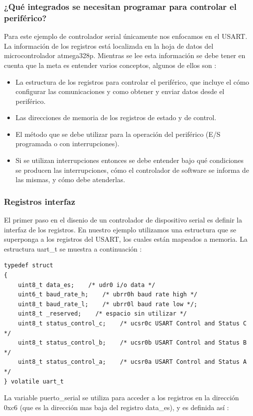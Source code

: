 \documentclass[12pt]{article}
\begin{document}
\subsubsection{¿Qué integrados se necesitan programar para controlar el periférico?}
Para este ejemplo de controlador serial únicamente nos enfocamos
en el USART. La información de los registros está localizada en la hoja
de datos del microcontrolador atmega328p. Mientras se lee esta información
se debe tener en cuenta que la meta es entender varios conceptos, algunos
de ellos son :
\begin{itemize}
\item La estructura de los registros para controlar el periférico, que incluye
el cómo configurar las comunicaciones y como obtener y enviar
datos desde el periférico.
\item Las direcciones de memoria de los registros de estado y de control.
\item El método que se debe utilizar para la operación del periférico (E/S 
programada o con interrupciones).
\item Si se utilizan interrupciones entonces se debe entender bajo qué condiciones
se producen las interrupciones, cómo el controlador de software se informa
de las mismas, y cómo debe atenderlas.
\end{itemize}

\subsubsection *{Registros interfaz}

El primer paso en el disenio de un controlador de dispositivo serial es definir
la interfaz de los registros. En nuestro ejemplo utilizamos
una estructura que se superponga a los registros del USART, los cuales
están mapeados a memoria. La estructura uart\_t se muestra a continuación :


\begin{verbatim}
typedef struct 
{
    uint8_t data_es;	/* udr0 i/o data */
    uint6_t baud_rate_h;    /* ubrr0h baud rate high */
    uint8_t baud_rate_l;    /* ubrr0l baud rate low */;
    uint8_t _reserved;    /* espacio sin utilizar */
    uint8_t status_control_c;    /* ucsr0c USART Control and Status C */
    uint8_t status_control_b;    /* ucsr0b USART Control and Status B */
    uint8_t status_control_a;    /* ucsr0a USART Control and Status A */
} volatile uart_t
\end{verbatim}

La variable puerto\_serial se utiliza para acceder a los registros
en la dirección 0xc6 (que es la dirección mas baja del registro data\_es),
y es definida así :
\end{document}
